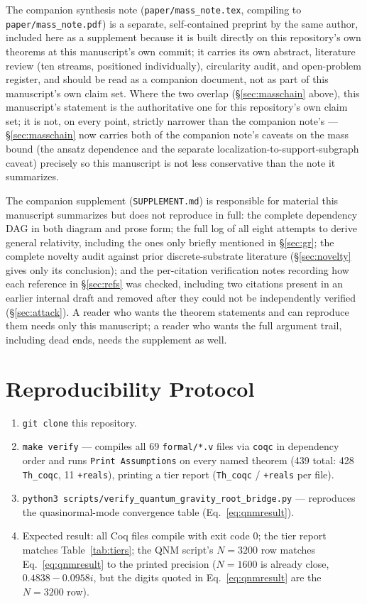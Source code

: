 \documentclass[10pt,twocolumn]{article}
\begin{document}
The companion synthesis note (\texttt{paper/mass\_note.tex}, compiling to
\texttt{paper/mass\_note.pdf}) is a separate, self-contained preprint by the
same author, included here as a supplement because it is built directly on
this repository's own theorems at this manuscript's own commit; it carries
its own abstract, literature review (ten streams, positioned individually),
circularity audit, and open-problem register, and should be read as a
companion document, not as part of this manuscript's own claim set. Where the
two overlap (\S\ref{sec:masschain} above), this manuscript's statement is the
authoritative one for this repository's own claim set; it is not, on every
point, strictly narrower than the companion note's --- \S\ref{sec:masschain}
now carries both of the companion note's caveats on the mass bound (the
ansatz dependence and the separate localization-to-support-subgraph caveat)
precisely so this manuscript is not less conservative than the note it
summarizes.

The companion supplement (\texttt{SUPPLEMENT.md}) is responsible for material
this manuscript summarizes but does not reproduce in full: the complete
dependency DAG in both diagram and prose form; the full log of all eight
attempts to derive general relativity, including the ones only briefly
mentioned in \S\ref{sec:gr}; the complete novelty audit against prior
discrete-substrate literature (\S\ref{sec:novelty} gives only its conclusion);
and the per-citation verification notes recording how each reference in
\S\ref{sec:refs} was checked, including two citations present in an earlier
internal draft and removed after they could not be independently verified
(\S\ref{sec:attack}). A reader who wants the theorem statements and can
reproduce them needs only this manuscript; a reader who wants the full
argument trail, including dead ends, needs the supplement as well.

\section{Reproducibility Protocol}
\label{sec:repro}
\begin{enumerate}[nosep,leftmargin=1.2em]
\item \texttt{git clone} this repository.
\item \texttt{make verify} --- compiles all 69 \texttt{formal/*.v} files via
\texttt{coqc} in dependency order and runs \texttt{Print Assumptions} on every named
theorem (439 total: 428 \texttt{Th\_coqc}, 11 \texttt{+reals}), printing a tier report
(\texttt{Th\_coqc} / \texttt{+reals} per file).
\item \texttt{python3 scripts/verify\_quantum\_gravity\_root\_bridge.py} ---
reproduces the quasinormal-mode convergence table (Eq.~\ref{eq:qnmresult}).
\item Expected result: all Coq files compile with exit code 0; the tier report
matches Table~\ref{tab:tiers}; the QNM script's $N=3200$ row matches
Eq.~\ref{eq:qnmresult} to the printed precision ($N=1600$ is already close,
$0.4838-0.0958i$, but the digits quoted in Eq.~\ref{eq:qnmresult} are the
$N=3200$ row).
\end{enumerate}
\end{document}
